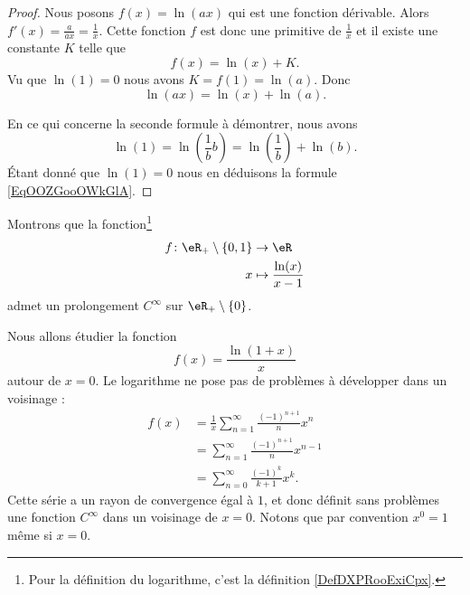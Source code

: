 \begin{proof}
    Nous posons \( f(x)=\ln(ax)\) qui est une fonction dérivable. Alors \( f'(x)=\frac{ a }{ ax }=\frac{1}{ x }\). Cette fonction \( f\) est donc une primitive de \( \frac{1}{ x }\) et il existe une constante \( K\) telle que
    \begin{equation}
        f(x)=\ln(x)+K.
    \end{equation}
    Vu que \( \ln(1)=0\) nous avons \( K=f(1)= \ln(a)\). Donc
    \begin{equation}
        \ln(ax)=\ln(x)+\ln(a).
    \end{equation}

    En ce qui concerne la seconde formule à démontrer, nous avons
    \begin{equation}
        \ln(1)=\ln\left( \frac{1}{ b }b \right)=\ln\left( \frac{1}{ b } \right)+\ln(b).
    \end{equation}
    Étant donné que $\ln(1)=0$ nous en déduisons la formule \eqref{EqOOZGooOWkGlA}.
\end{proof}

\begin{example}
    Montrons que la fonction\footnote{Pour la définition du logarithme, c'est la définition \ref{DefDXPRooExiCpx}.}
    \begin{equation}
        \begin{aligned}
            f\colon \eR_+\setminus\{ 0,1 \}&\to \eR \\
            x&\mapsto \frac{ \ln(x) }{ x-1 } 
        \end{aligned}
    \end{equation}
    admet un prolongement \( C^{\infty}\) sur \( \eR_+\setminus\{ 0 \}\).

    Nous allons étudier la fonction
    \begin{equation}
        f(x)=\frac{ \ln(1+x) }{ x }
    \end{equation}
    autour de \( x=0\). Le logarithme ne pose pas de problèmes à développer dans un voisinage :
    \begin{subequations}
        \begin{align}
            f(x)&=\frac{1}{ x }\sum_{n=1}^{\infty}\frac{ (-1)^{n+1} }{ n }x^n\\
            &=\sum_{n=1}^{\infty}\frac{ (-1)^{n+1} }{ n }x^{n-1}\\
            &=\sum_{n=0}^{\infty}\frac{ (-1)^k }{ k+1 }x^k.
        \end{align}
    \end{subequations}
    Cette série a un rayon de convergence égal à \( 1\), et donc définit sans problèmes une fonction \( C^{\infty}\) dans un voisinage de \( x=0\). Notons que par convention \( x^0=1\) même si \( x=0\).
\end{example}

